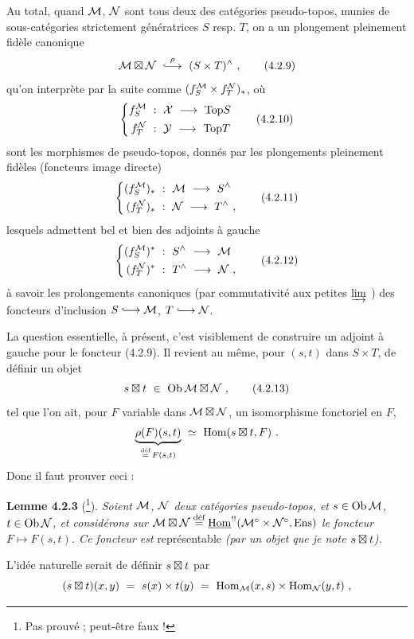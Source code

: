 Au total, quand $\cM$, $\cN$ sont tous deux des catégories pseudo-topos, munies de sous-catégories strictement génératrices $S$ resp. $T$, on a un plongement pleinement fidèle canonique
\[
\cM\bt\cN \ \overset{\rho}{\linj}\ (S\times T)^{\wedge} \ ,
\tag*{(4.2.9)}
\]
qu'on interprète par la suite comme $(f_{S}^{\cM}\times f_{T}^{\cN})_{*}$, où
\[
\left\{
\begin{aligned}
f_{S}^{\cM} \ &:\ \cX \ \longrightarrow\ \Top S\\
f_{T}^{\cN} \ &:\ \cY \ \longrightarrow\ \Top T
\end{aligned}
\right.
\tag*{(4.2.10)}
\]
sont les morphismes de pseudo-topos, donnés par les plongements pleinement fidèles (foncteurs image directe)
\[
\left\{
\begin{aligned}
(f_{S}^{\cM})_{*} \ &:\ \cM \ \longrightarrow\ S^{\wedge}\\
(f_{T}^{\cN})_{*} \ &:\ \cN \ \longrightarrow\ T^{\wedge} \ ,
\end{aligned}
\right.
\tag*{(4.2.11)}
\]
lesquels admettent bel et bien des adjoints à gauche
\[
\left\{
\begin{aligned}
(f_{S}^{\cM})^{*} \ &:\ S^{\wedge} \ \longrightarrow\ \cM\\
(f_{T}^{\cN})^{*} \ &:\ T^{\wedge} \ \longrightarrow\ \cN \ ,
\end{aligned}
\right.
\tag*{(4.2.12)}
\]
à savoir les prolongements canoniques (par commutativité aux petites $\varinjlim$ ) des foncteurs d'inclusion $S \linj \cM$, $T \linj \cN$.

La question essentielle, à présent, c'est visiblement de construire un adjoint à gauche pour le foncteur (4.2.9). Il revient au même, pour $(s,t)$ dans $S\times T$, de définir un objet
\[
s\bt t \ \in\ \Ob\cM\bt\cN \ ,
\tag*{(4.2.13)}
\]
tel que l'on ait, pour $F$ variable dans $\cM\bt\cN$, un isomorphisme fonctoriel en $F$,
\[
\underbrace{\rho(F)(s,t)}_{\defeq\, F(s,t)} \ \simeq\ \Hom(s\bt t,F) \ .
\]
Donc il faut prouver ceci :

\textbf{Lemme 4.2.3} (\footnote[4]{Pas prouvé ; peut-être faux !}). \textit{Soient $\cM$, $\cN$ deux catégories pseudo-topos, et $s\in\Ob\cM$, $t\in\Ob\cN$, et considérons sur $\cM\bt\cN\defeq\uHom^{!!}(\cM^{\circ}\times\cN^{\circ},\Ens)$ le foncteur $F\longmapsto F(s,t)$. Ce foncteur est} représentable \textit{(par un objet que je note $s\bt t$).}

L'idée naturelle serait de définir $s\bt t$ par
\[
(s\bt t)(x,y) \ =\ s(x)\times t(y) \ =\ \Hom_{\cM}(x,s)\times\Hom_{\cN}(y,t) \ ,
\]

